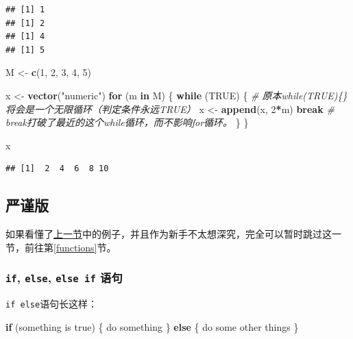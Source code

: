 \documentclass[]{book}
\newenvironment{Shaded}{\begin{snugshade}}{\end{snugshade}}
\newcommand{\CommentTok}[1]{\textcolor[rgb]{0.56,0.35,0.01}{\textit{#1}}}
\newcommand{\ControlFlowTok}[1]{\textcolor[rgb]{0.13,0.29,0.53}{\textbf{#1}}}
\newcommand{\DecValTok}[1]{\textcolor[rgb]{0.00,0.00,0.81}{#1}}
\newcommand{\KeywordTok}[1]{\textcolor[rgb]{0.13,0.29,0.53}{\textbf{#1}}}
\newcommand{\NormalTok}[1]{#1}
\newcommand{\OperatorTok}[1]{\textcolor[rgb]{0.81,0.36,0.00}{\textbf{#1}}}
\newcommand{\OtherTok}[1]{\textcolor[rgb]{0.56,0.35,0.01}{#1}}
\newcommand{\StringTok}[1]{\textcolor[rgb]{0.31,0.60,0.02}{#1}}
\begin{document}
\begin{verbatim}
## [1] 1
## [1] 2
## [1] 4
## [1] 5
\end{verbatim}

\begin{Shaded}
\begin{Highlighting}[]
\NormalTok{M <-}\StringTok{ }\KeywordTok{c}\NormalTok{(}\DecValTok{1}\NormalTok{, }\DecValTok{2}\NormalTok{, }\DecValTok{3}\NormalTok{, }\DecValTok{4}\NormalTok{, }\DecValTok{5}\NormalTok{)}

\NormalTok{x <-}\StringTok{ }\KeywordTok{vector}\NormalTok{(}\StringTok{"numeric"}\NormalTok{)}
\ControlFlowTok{for}\NormalTok{ (m }\ControlFlowTok{in}\NormalTok{ M) \{}
  \ControlFlowTok{while}\NormalTok{ (}\OtherTok{TRUE}\NormalTok{) \{ }\CommentTok{# 原本while(TRUE)\{\}将会是一个无限循环（判定条件永远TRUE）}
\NormalTok{    x <-}\StringTok{ }\KeywordTok{append}\NormalTok{(x, }\DecValTok{2}\OperatorTok{*}\NormalTok{m)}
    \ControlFlowTok{break} \CommentTok{# break打破了最近的这个while循环，而不影响for循环。}
\NormalTok{  \}}
\NormalTok{\}}

\NormalTok{x}
\end{Highlighting}
\end{Shaded}

\begin{verbatim}
## [1]  2  4  6  8 10
\end{verbatim}

\subsection{严谨版}

如果看懂了\protect\hyperlink{kickstart}{上一节}中的例子，并且作为新手不太想深究，完全可以暂时跳过这一节，前往第\ref{functions}节。

\hypertarget{if-else-else-if-}{%
\subsubsection{\texorpdfstring{\texttt{if}, \texttt{else}, \texttt{else\ if} 语句}{if, else, else if 语句}}\label{if-else-else-if-}}

\texttt{if\ else}语句长这样：

\begin{Shaded}
\begin{Highlighting}[]
\ControlFlowTok{if}\NormalTok{ (something is true) \{}
\NormalTok{  do something}
\NormalTok{\} }\ControlFlowTok{else}\NormalTok{ \{}
\NormalTok{  do some other things }
\NormalTok{\}}
\end{Highlighting}
\end{Shaded}
\end{document}
